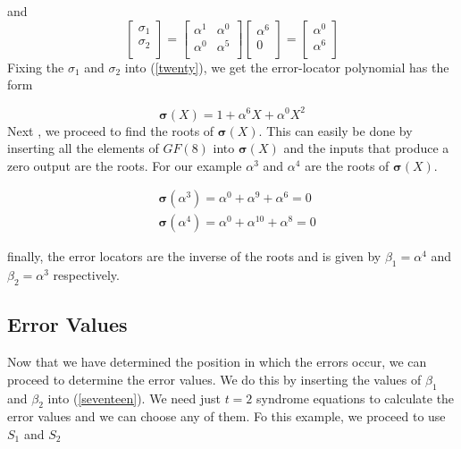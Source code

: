 \documentclass[fontsize=12pt]{article}
\begin{document}
and 
\begin{equation}
\begin{bmatrix}
    \sigma_1       \\
    \sigma_2       \\
\end{bmatrix}
=
\begin{bmatrix}
 \alpha^1       & \alpha^0 \\
    \alpha^0      &  \alpha^5 \\
\end{bmatrix}
\begin{bmatrix}
 \alpha^6       \\
    0     \\
    \end{bmatrix}
=
\begin{bmatrix}
    \alpha^0       \\
    \alpha^6     \\
\end{bmatrix}
\end{equation}
Fixing the $\sigma_1$ and $\sigma_2$ into (\ref{twenty}), we get the error-locator polynomial has the form 

\begin{equation}
\mathbf{\sigma}(X)=1+ \alpha^6X+\alpha^0X^2
\end{equation}
Next , we proceed to find the roots of $\mathbf{\sigma}(X)$. This can easily be done by inserting all the elements of $GF(8)$ into $\mathbf{\sigma}(X)$ and the inputs that produce a zero output are the roots. For our example $\alpha^3$ and $\alpha^4$ are the roots of $\mathbf{\sigma}(X)$. 

\begin{equation}
\begin{split}
&\mathbf{\sigma}(\alpha^3)=\alpha^0+ \alpha^9+\alpha^6 = 0\\
&\mathbf{\sigma}(\alpha^4)=\alpha^0+ \alpha^{10}+\alpha^8 = 0
\end{split}
\end{equation}

finally, the error locators are the inverse of the roots and is given by $\beta_1=\alpha^4$ and $\beta_2=\alpha^3$ respectively. 

\subsection{Error Values} 
Now that we have determined the position in which the errors occur, we can proceed to determine the error values. We do this by inserting the values of $\beta_1$ and $\beta_2$ into (\ref{seventeen}). We need just $t=2$ syndrome equations to calculate the error values and we can choose any of them. Fo this example, we proceed to use $S_1$ and $S_2$
\end{document}
